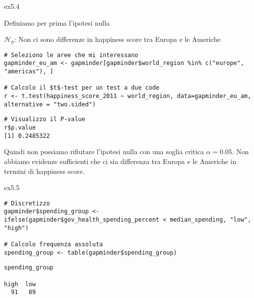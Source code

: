 \vspace{0.5cm}

\begin{solution}{ex5.4}
	
\noindent Definiamo per prima l'ipotesi nulla

\noindent $\mathcal{H}_0$: Non ci sono differenze in happiness score tra Europa e le Americhe

\begin{lstlisting}[style=Rstylescript]
# Seleziono le aree che mi interessano	
gapminder_eu_am <- gapminder[gapminder$world_region %in% c("europe", "americas"), ]

# Calcolo il $t$-test per un test a due code
r <- t.test(happiness_score_2011 ~ world_region, data=gapminder_eu_am, alternative = "two.sided")
\end{lstlisting}

\begin{lstlisting}[style=Rstyle]
# Visualizzo il P-value
r$p.value	
[1] 0.2485322
\end{lstlisting}
%
Quindi non possiamo rifiutare l'ipotesi nulla con una soglia critica $\alpha = 0.05$. Non abbiamo evidenze sufficienti che ci sia differenza tra Europa e le Americhe in termini di happiness score.
	
\end{solution}	


\vspace{0.5cm}

\begin{solution}{ex5.5}

\begin{lstlisting}[style=Rstylescript]
# Discretizzo
gapminder$spending_group <- ifelse(gapminder$gov_health_spending_percent < median_spending, "low", "high")

# Calcolo frequenza assoluta
spending_group <- table(gapminder$spending_group)
\end{lstlisting}


\begin{lstlisting}[style=Rstyle]
spending_group

high  low 
  91   89 
\end{lstlisting}

\end{solution}


\vspace{0.5cm}


